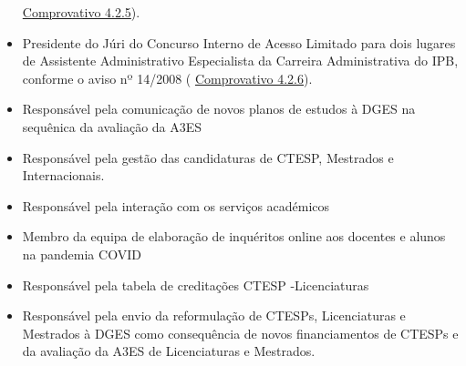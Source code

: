 \documentclass[11pt]{article}
\begin{document}
\begin{itemize}
{\href{run:MissaoIPBoutros/TecnicoPrincipal.pdf}{Comprovativo 4.2.5}).}
\item{Presidente do Júri do Concurso Interno de Acesso Limitado para dois lugares de Assistente Administrativo Especialista da Carreira Administrativa do IPB, conforme o aviso nº 14/2008 (
\href{run:MissaoIPBoutros/AssAdmin.pdf}{Comprovativo 4.2.6}).}
\item{Responsável pela comunicação de novos planos de estudos à DGES na sequênica da avaliação da A3ES}
\item{Responsável pela gestão das candidaturas de CTESP, Mestrados e Internacionais.}
\item{Responsável pela interação com os serviços académicos}
\item{Membro da equipa de elaboração de inquéritos online aos docentes e alunos na pandemia COVID}
\item{Responsável pela tabela de creditações CTESP -Licenciaturas}
\item{Responsável pela envio da reformulação de CTESPs, Licenciaturas e Mestrados à DGES como consequência de novos financiamentos de CTESPs e da avaliação da A3ES de Licenciaturas e Mestrados.}
\end{itemize}
\end{document}
